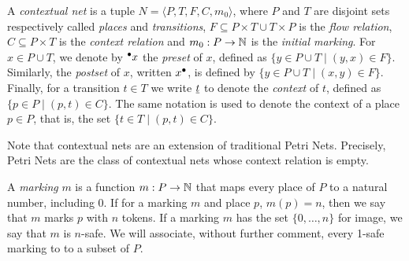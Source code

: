 \documentclass[11pt,a4paper]{article}
\begin{document}
%
%
%
%


A \emph{contextual net} is a tuple $N = \langle P, T, F, C, m_0 \rangle$, where
$P$ and $T$ are disjoint sets respectively called \emph{places} and
\emph{transitions}, $F \subseteq P \times T \cup T \times P$ is the \emph{flow
relation}, $C \subseteq P \times T$ is the \emph{context relation} and $m_0 : P
\to \mathbb{N}$ is the \emph{initial marking}.  For $x \in P \cup T$, we denote by
${}^\bullet x$ the \emph{preset} of $x$, defined as $\{y \in P \cup T \mid (y, x) \in
F\}$.  Similarly, the \emph{postset} of $x$, written $x^\bullet$, is defined by
$\{y \in P \cup T \mid (x, y) \in F\}$.  Finally, for a transition $t \in T$ we
write $\underline{t}$ to denote the \emph{context} of $t$, defined as $\{p \in P \mid
(p, t) \in C\}$.  The same notation is used to denote the context of a place $p
\in P$, that is, the set $\{t \in T \mid (p, t) \in C\}$.

Note that contextual nets are an extension of traditional Petri Nets.
Precisely, Petri Nets are the class of contextual nets whose context relation
is empty.

A \emph{marking} $m$ is a function $m : P \to \mathbb{N}$ that maps every place of $P$
to a natural number, including 0. If for a marking $m$ and place $p$, $m(p) =
n$, then we say that $m$ marks $p$ with $n$ tokens.  If a marking $m$ has the
set $\{0, \ldots, n\}$ for image, we say that $m$ is $n$-safe.  We will
associate, without further comment, every 1-safe marking to to a subset of $P$.
\end{document}
